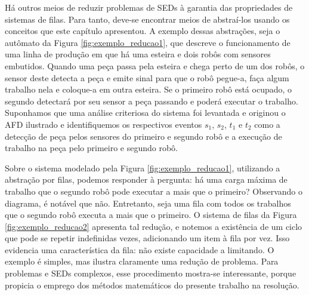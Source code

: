 Há outros meios de reduzir problemas de SEDs à garantia das propriedades de sistemas de filas. Para tanto, deve-se encontrar meios de abstraí-los usando os conceitos que este capítulo apresentou. A exemplo dessas abstrações, seja o autômato da Figura \ref{fig:exemplo_reducao1}, que descreve o funcionamento de uma linha de produção em que há uma esteira e dois robôs com sensores embutidos. Quando uma peça passa pela esteira e chega perto de um dos robôs, o sensor deste detecta a peça e emite sinal para que o robô pegue-a, faça algum trabalho nela e coloque-a em outra esteira. Se o primeiro robô está ocupado, o segundo detectará por seu sensor a peça passando e poderá executar o trabalho. Suponhamos que uma análise criteriosa do sistema foi levantada e originou o AFD ilustrado e identifiquemos os respectivos eventos $s_1$, $s_2$, $t_1$ e $t_2$ como a detecção de peça pelos sensores do primeiro e segundo robô e a execução de trabalho na peça pelo primeiro e segundo robô.


Sobre o sistema modelado pela Figura \ref{fig:exemplo_reducao1}, utilizando a abstração por filas, podemos responder à pergunta: há uma carga máxima de trabalho que o segundo robô pode executar a mais que o primeiro? Observando o diagrama, é notável que não. Entretanto, seja uma fila com todos os trabalhos que o segundo robô executa a mais que o primeiro. O sistema de filas da Figura \ref{fig:exemplo_reducao2} apresenta tal redução, e notemos a existência de um ciclo que pode se repetir indefinidas vezes, adicionando um item à fila por vez. Isso evidencia uma característica da fila: não existe capacidade a limitando. O exemplo é simples, mas ilustra claramente uma redução de problema. Para problemas e SEDs complexos, esse procedimento mostra-se interessante, porque propicia o emprego dos métodos matemáticos do presente trabalho na resolução.

